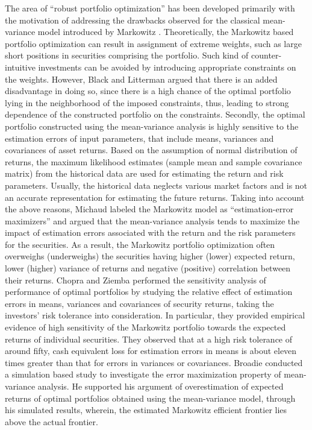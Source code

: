 \documentclass[12pt]{article}
\numberwithin{equation}{section}
\begin{document}
The area of ``robust portfolio optimization'' has been developed primarily with the motivation of addressing the drawbacks observed for the classical mean-variance model introduced by Markowitz \cite{Markowitz1,Markowitz2}. Theoretically, the Markowitz based portfolio optimization can result in assignment of extreme weights, such as large short positions in securities comprising the portfolio. Such kind of counter-intuitive investments can be avoided by introducing appropriate constraints on the weights. However, Black and Litterman \cite{Black} argued that there is an added disadvantage in doing so, since there is a high chance of the optimal portfolio lying in the neighborhood of the imposed constraints, thus, leading to strong dependence of the constructed portfolio on the constraints. Secondly, the optimal portfolio constructed using the mean-variance analysis is highly sensitive to the estimation errors of input parameters, that include means, variances and covariances of asset returns. Based on the assumption of normal distribution of returns, the maximum likelihood estimates (sample mean and sample covariance matrix) from the historical data are used for estimating the return and risk parameters. Usually, the historical data neglects various market factors and is not an accurate representation for estimating the future returns. Taking into account the above reasons, Michaud \cite{Michaud} labeled the Markowitz model as ``estimation-error maximizers'' and argued that the mean-variance analysis tends to maximize the impact of estimation errors associated with the return and the risk parameters for the securities. As a result, the Markowitz portfolio optimization often overweighs (underweighs) the securities having higher (lower) expected return, lower (higher) variance of returns and negative (positive) correlation between their returns. Chopra and Ziemba \cite{Chopra} performed the sensitivity analysis of performance of optimal portfolios by studying the relative effect of estimation errors in means, variances and covariances of security returns, taking the investors' risk tolerance into consideration. In particular, they provided empirical evidence of high sensitivity of the Markowitz portfolio towards the expected returns of individual securities. They observed that at a high risk tolerance of around fifty, cash equivalent loss for estimation errors in means is about eleven times greater than that for errors in variances or covariances. Broadie \cite{Broadie} conducted a simulation based study to investigate the error maximization property of mean-variance analysis. He supported his argument of overestimation of expected returns of optimal portfolios obtained using the mean-variance model, through his simulated results, wherein, the estimated Markowitz efficient frontier lies above the actual frontier.
\end{document}
